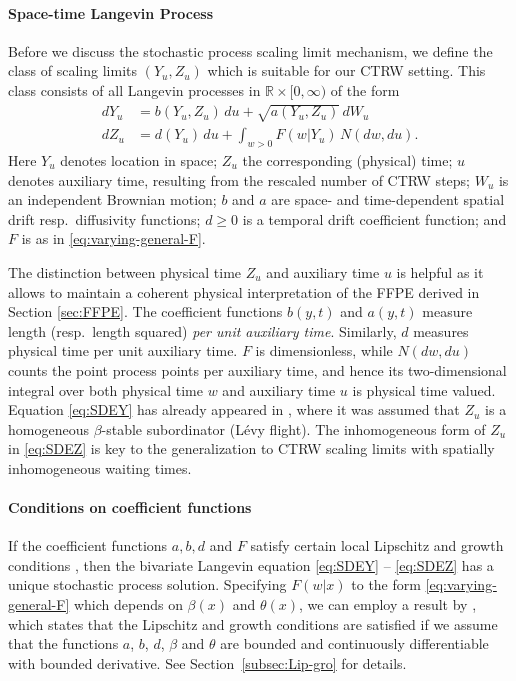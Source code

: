 \documentclass[a4paper,12pt]{elsarticle}
\numberwithin{equation}{section}
\theoremstyle{plain}
\theoremstyle{definition}
\theoremstyle{remark}
\numberwithin{equation}{section}
\newcommand{\spc}{\mathbb R}
\newcommand{\spctim}{\spc \times [0,\infty)}
\newcommand{\1}{\mathbf 1}
\begin{document}
\paragraph{Space-time Langevin Process}
Before we discuss the stochastic process scaling limit mechanism, we 
define the class of scaling limits $(Y_u, Z_u)$ which is suitable for our CTRW setting. This class consists of all Langevin processes in 
$\spctim$ of the form
\begin{align} \label{eq:SDEY}
dY_u &= b(Y_{u}, Z_{u})\,du + \sqrt{a(Y_{u}, Z_{u})}\, dW_u \\
\label{eq:SDEZ}
dZ_u &= d(Y_{u})\,du + \int_{w > 0} F(w | Y_{u}) \, N(dw, du).
\end{align}
Here $Y_u$ denotes location in space; $Z_u$ the corresponding (physical) time;
$u$ denotes auxiliary time, resulting from the rescaled number of CTRW steps;
$W_u$ is an independent Brownian motion; 
$b$ and $a$ are space- and time-dependent
spatial drift resp.\ diffusivity functions; 
$d \ge 0$ is a temporal drift coefficient function;
and $F$ is as in \eqref{eq:varying-general-F}.

The distinction between physical time $Z_u$ and auxiliary time $u$ is helpful
as it allows to maintain a coherent physical interpretation of the FFPE derived
in Section \ref{sec:FFPE}.
The coefficient functions $b(y,t)$ and $a(y,t)$ measure
length (resp.\ length squared) \emph{per unit auxiliary time}.  
Similarly,
$d$ measures physical time per unit auxiliary time.
$F$ is 
dimensionless, while $N(dw,du)$ counts the point process points
per auxiliary time, and hence its two-dimensional integral over both physical 
time $w$ and auxiliary time $u$ is physical time valued.
Equation \eqref{eq:SDEY} has already appeared in \cite{Weron2008}, where
it was assumed that $Z_u$ is a homogeneous $\beta$-stable subordinator (L\'evy
flight).
The inhomogeneous form of $Z_u$ in \eqref{eq:SDEZ} is key to the generalization
to CTRW scaling limits with spatially inhomogeneous waiting times.



\paragraph{Conditions on coefficient functions}
If the coefficient functions $a, b, d$ and $F$ satisfy certain local 
Lipschitz and growth conditions \cite[Chapter 6]{Applebaum}, then the bivariate
Langevin equation \eqref{eq:SDEY} -- \eqref{eq:SDEZ} has a unique stochastic 
process solution.  Specifying $F(w|x)$ to the form \eqref{eq:varying-general-F} which depends on 
$\beta(x)$ and $\theta(x)$, we can employ a result by \cite{Tsuchiya1992}, 
which states that the Lipschitz and growth conditions are 
satisfied if we assume that the functions $a$, $b$, $d$, $\beta$ and $\theta$ 
are bounded and continuously differentiable with bounded derivative.
See Section~\ref{subsec:Lip-gro} for details.
\end{document}
